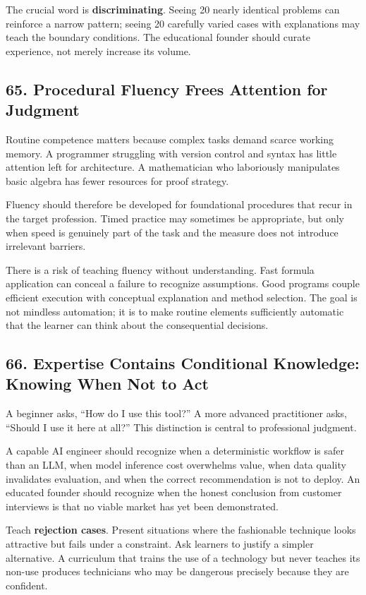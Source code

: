 The crucial word is \textbf{discriminating}. Seeing 20 nearly identical problems can reinforce a narrow pattern; seeing 20 carefully varied cases with explanations may teach the boundary conditions. The educational founder should curate experience, not merely increase its volume.

\subsection*{65. Procedural Fluency Frees Attention for Judgment}

Routine competence matters because complex tasks demand scarce working memory. A programmer struggling with version control and syntax has little attention left for architecture. A mathematician who laboriously manipulates basic algebra has fewer resources for proof strategy.

Fluency should therefore be developed for foundational procedures that recur in the target profession. Timed practice may sometimes be appropriate, but only when speed is genuinely part of the task and the measure does not introduce irrelevant barriers.

There is a risk of teaching fluency without understanding. Fast formula application can conceal a failure to recognize assumptions. Good programs couple efficient execution with conceptual explanation and method selection. The goal is not mindless automation; it is to make routine elements sufficiently automatic that the learner can think about the consequential decisions.

\subsection*{66. Expertise Contains Conditional Knowledge: Knowing When Not to Act}

A beginner asks, ``How do I use this tool?'' A more advanced practitioner asks, ``Should I use it here at all?'' This distinction is central to professional judgment.

A capable AI engineer should recognize when a deterministic workflow is safer than an LLM, when model inference cost overwhelms value, when data quality invalidates evaluation, and when the correct recommendation is not to deploy. An educated founder should recognize when the honest conclusion from customer interviews is that no viable market has yet been demonstrated.

Teach \textbf{rejection cases}. Present situations where the fashionable technique looks attractive but fails under a constraint. Ask learners to justify a simpler alternative. A curriculum that trains the use of a technology but never teaches its non-use produces technicians who may be dangerous precisely because they are confident.

